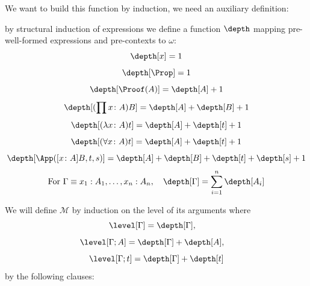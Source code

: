 We want to build this function by induction, we need an auxiliary definition:
\begin{definition}
    by structural induction of expressions we define a function \textbf{$\depth$} mapping
    pre-well-formed expressions and pre-contexts to $\omega$:
    \[\depth[x] = 1\]
    \[\depth[\Prop] = 1\]
    \[\depth[\Proof(A)] = \depth[A] + 1\]
    \[\depth[(\prod x \colon A) B] = \depth[A] + \depth[B] + 1\]
    \[\depth[(\lambda x \colon A) t] = \depth[A] + \depth[t] + 1\]
    \[\depth[(\forall x \colon A) t] =  \depth[A] + \depth[t] + 1\]
    \[\depth[\App([x \colon A] B, t, s)] = \depth[A] + \depth[B] + \depth[t] + \depth[s] + 1\]
    \[
        \text{For } \Gamma \equiv x_1 : A_1, \dots, x_n : A_n, 
        \quad
        \depth[\Gamma] = \sum_{i=1}^{n}\depth[A_i]
    \]
\end{definition}
We will define $\mathcal{M}$ by induction on the level of its arguments where
\[    \level[\Gamma] = \depth[\Gamma], \quad \]
\[    \level[\Gamma; A] = \depth[\Gamma] + \depth[A], \quad \]
\[    \level[\Gamma; t] = \depth[\Gamma] + \depth[t] \]
by the following clauses:
